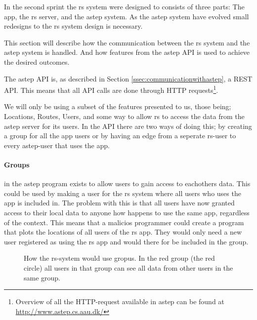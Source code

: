 In the second sprint the \gls{rs} system were designed to consists of three parts: The app, the \gls{rs} server, and the \gls{astep} system.
As the \gls{astep} system have evolved small redesigns to the \gls{rs} system design is necessary.

This section will describe how the communication between the \gls{rs} system and the \gls{astep} system is handled.
And how features from the \gls{astep} API is used to achieve the desired outcomes.

The \gls{astep} API is, as described in Section \ref{ssec:communicationwithastep}, a REST API. 
This means that all API calls are done through HTTP requests\footnote{Overview of all the HTTP-request available in \gls{astep} can be found at \url{http://www.astep.cs.aau.dk/}}.

We will only be using a subset of the features presented to us, those being; Locations, Routes, Users, and some way to allow \gls{rs} to access the data from the \gls{astep} server for its users.
In the API there are two ways of doing this; by creating a group for all the app users or by having an edge from a seperate \gls{rs}-user to every \gls{astep}-user that uses the app.

\paragraph{Groups} in the \gls{astep} program exists to allow users to gain access to eachothers data.
This could be used by making a user for the \gls{rs} system where all users who uses the app is included in.
The problem with this is that all users have now granted access to their local data to anyone how happens to use the same app, regardless of the context. 
This means that a malicios programmer could create a program that plots the locations of all users of the \gls{rs} app.
They would only need a new user registered as using the \gls{rs} app and would there for be included in the group.

\begin{figure}[h]
	\centering
	\label{fig:astepgroup}
	\caption{How the \gls{rs}-system would use gropus. In the red group (the red circle) all users in that group can see all data from other users in the same group.}
\end{figure}

